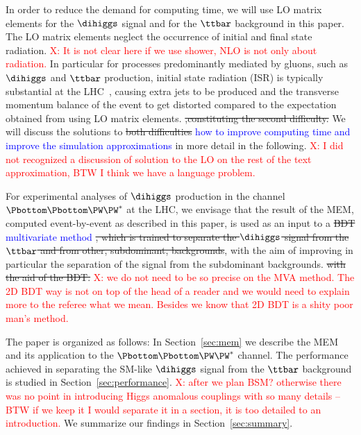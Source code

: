 In order to reduce the demand for computing time,
we will use LO matrix elements for the $\dihiggs$ signal and for the $\ttbar$ background in this paper.
The LO matrix elements neglect the occurrence of initial and final state radiation.  \textcolor{red}{X: It is not clear here if we use shower, NLO is not only about radiation.} 
In particular for processes predominantly mediated by gluons, such as $\dihiggs$ and $\ttbar$ production,
initial state radiation (ISR) is typically substantial at the LHC~\cite{Alwall:2010cq},
causing extra jets to be produced and the transverse momentum balance of the event to get distorted compared to the expectation obtained from using LO matrix elements. \st{,constituting the second difficulty.}
We will discuss the solutions to \st{both difficulties} \textcolor{blue}{how to improve computing time and improve the simulation approximations} in more detail in the following. \textcolor{red}{X: I did not recognized a discussion of solution to the LO on the rest of the text approximation, BTW I think we have a language problem.} 

For experimental analyses of $\dihiggs$ production in the channel $\Pbottom\Pbottom\PW\PW^{*}$ at the LHC,
we envisage that the result of the MEM, computed event-by-event as described in this paper, 
is used as an input to a \st{BDT} \textcolor{blue}{multivariate method} \st{, which is trained to separate the $\dihiggs$ signal from the $\ttbar$ and from other, subdominant, backgrounds},
with the aim of improving in particular the separation of the signal from the subdominant backgrounds. \st{with the aid of the BDT.}  \textcolor{red}{X: we do not need to be so precise on the MVA method. The 2D BDT way is not on top of the head of a reader and we would need to explain more to the referee what we mean. Besides we know that 2D BDT is a shity poor man's method.}

The paper is organized as follows:
In Section~\ref{sec:mem} we describe the MEM and its application to the $\Pbottom\Pbottom\PW\PW^{*}$ channel.
The performance achieved in separating the SM-like $\dihiggs$ signal from the $\ttbar$ background is studied in Section~\ref{sec:performance}. 
\textcolor{red}{X: after we plan BSM? otherwise there was no point in introducing Higgs anomalous couplings with so many details -- BTW if we keep it I would separate it in a section, it is too detailed to an introduction.} 
We summarize our findings in Section~\ref{sec:summary}.
